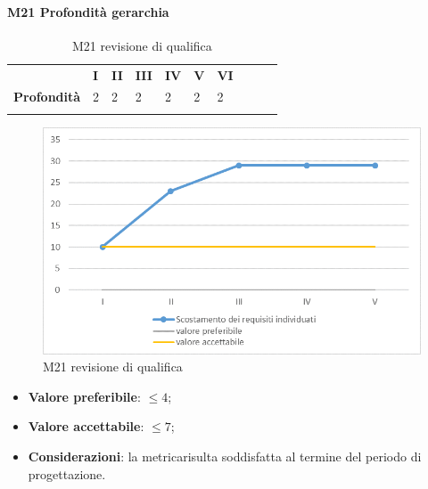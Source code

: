 \begin{itemize}
\begin{itemize}
\paragraph{M21 Profondità gerarchia} \mbox{}
\begin{longtable}[H!] {						
		>{}p{50mm}  		
		>{}p{8mm}
		>{}p{8mm}		
		>{}p{8mm}		
		>{}p{8mm}		
		>{}p{8mm}		
		>{}p{8mm}
		>{}p{8mm}
		>{}p{8mm}
		>{}p{8mm}
	}
	\rowcolor{gray!50}
	\textbf{} & \textbf{I} & \textbf{II} & \textbf{III} & \textbf{IV} & \textbf{V} & \textbf{VI} \TBstrut \\ [2mm]
	\textbf{Profondità} & 2 & 2 & 2 & 2 & 2 & 2 \TBstrut \\ [2mm]
	\rowcolor{white}
	\caption{M21 revisione di qualifica}
\end{longtable}
\begin{figure}[H] 	
	\includegraphics[width=\linewidth]{./img/grafici/RP1.png}	
	\caption{M21 revisione di qualifica}	
\end{figure}
\begin{itemize}
	\item \textbf{Valore preferibile}: $\le 4$;
	\item \textbf{Valore accettabile}: $\le 7$;
	\item \textbf{Considerazioni}: la metrica\glosp risulta soddisfatta al termine del periodo di progettazione\glo.
\end{itemize}


\end{itemize}
\end{itemize}
